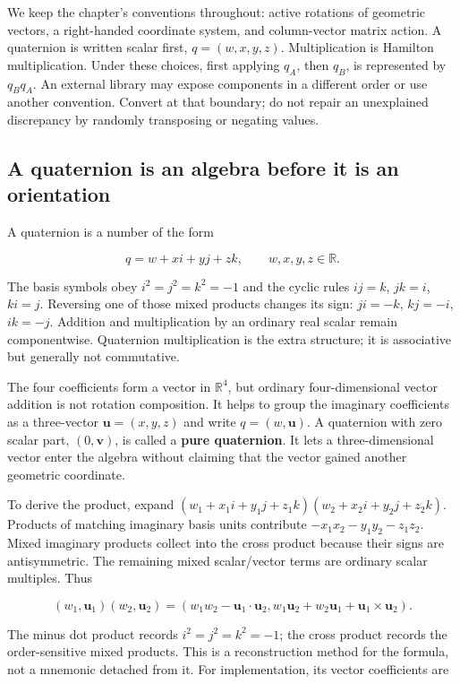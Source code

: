 We keep the chapter's conventions throughout: active rotations of geometric vectors, a right-handed coordinate system, and column-vector matrix action. A quaternion is written scalar first, \(q=(w,x,y,z)\). Multiplication is Hamilton multiplication. Under these choices, first applying \(q_A\), then \(q_B\), is represented by \(q_Bq_A\). An external library may expose components in a different order or use another convention. Convert at that boundary; do not repair an unexplained discrepancy by randomly transposing or negating values.

\subsection{A quaternion is an algebra before it is an orientation}\label{01-foundations-i-ch019-a-quaternion-is-an-algebra-before-it-is-an-orientation}

A quaternion is a number of the form

\[
q=w+xi+yj+zk,
\qquad w,x,y,z\in\mathbb R.
\]

The basis symbols obey \(i^2=j^2=k^2=-1\) and the cyclic rules \(ij=k\), \(jk=i\), \(ki=j\). Reversing one of those mixed products changes its sign: \(ji=-k\), \(kj=-i\), \(ik=-j\). Addition and multiplication by an ordinary real scalar remain componentwise. Quaternion multiplication is the extra structure; it is associative but generally not commutative.

The four coefficients form a vector in \(\mathbb R^4\), but ordinary four-dimensional vector addition is not rotation composition. It helps to group the imaginary coefficients as a three-vector \(\mathbf u=(x,y,z)\) and write \(q=(w,\mathbf u)\). A quaternion with zero scalar part, \((0,\mathbf v)\), is called a \textbf{pure quaternion}. It lets a three-dimensional vector enter the algebra without claiming that the vector gained another geometric coordinate.

To derive the product, expand \((w_1+x_1i+y_1j+z_1k)(w_2+x_2i+y_2j+z_2k)\). Products of matching imaginary basis units contribute \(-x_1x_2-y_1y_2-z_1z_2\). Mixed imaginary products collect into the cross product because their signs are antisymmetric. The remaining mixed scalar/vector terms are ordinary scalar multiples. Thus

\[
(w_1,\mathbf u_1)(w_2,\mathbf u_2)=
\left(w_1w_2-\mathbf u_1\cdot\mathbf u_2,
w_1\mathbf u_2+w_2\mathbf u_1+\mathbf u_1\times\mathbf u_2\right).
\]

The minus dot product records \(i^2=j^2=k^2=-1\); the cross product records the order-sensitive mixed products. This is a reconstruction method for the formula, not a mnemonic detached from it. For implementation, its vector coefficients are

